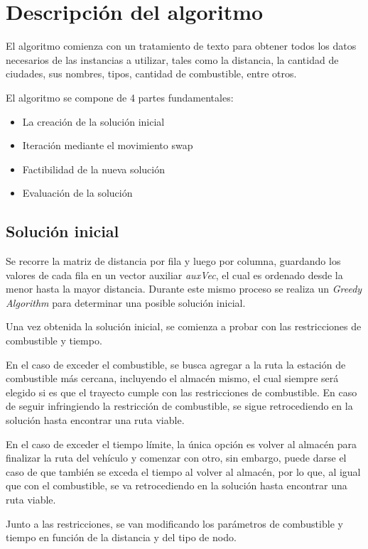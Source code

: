 \documentclass[letter, 10pt]{article}
\begin{document}
\newpage
\section{Descripci\'on del algoritmo}

El algoritmo comienza con un tratamiento de texto para obtener todos los datos necesarios de las instancias a utilizar, tales como la distancia, la cantidad de ciudades, sus nombres, tipos, cantidad de combustible, entre otros.

El algoritmo se compone de 4 partes fundamentales:
\begin{itemize}
\item La creación de la solución inicial
\item Iteración mediante el movimiento swap
\item Factibilidad de la nueva solución
\item Evaluación de la solución
\end{itemize} 

\subsection{Solución inicial}
Se recorre la matriz de distancia por fila y luego por columna, guardando los valores de cada fila en un vector auxiliar \textit{auxVec}, el cual es ordenado desde la menor hasta la mayor distancia. Durante este mismo proceso se realiza un \textit{Greedy Algorithm} para determinar una posible solución inicial.

Una vez obtenida la solución inicial, se comienza a probar con las restricciones de combustible y tiempo.

En el caso de exceder el combustible, se busca agregar a la ruta la estación de combustible más cercana, incluyendo el almacén mismo, el cual siempre será elegido si es que el trayecto cumple con las restricciones de combustible. En caso de seguir infringiendo la restricción de combustible, se sigue retrocediendo en la solución hasta encontrar una ruta viable.

En el caso de exceder el tiempo límite, la única opción es volver al almacén para finalizar la ruta del vehículo y comenzar con otro, sin embargo, puede darse el caso de que también se exceda el tiempo al volver al almacén, por lo que, al igual que con el combustible, se va retrocediendo en la solución hasta encontrar una ruta viable.

Junto a las restricciones, se van modificando los parámetros de combustible y tiempo en función de la distancia y del tipo de nodo.
\newpage
\end{document}
